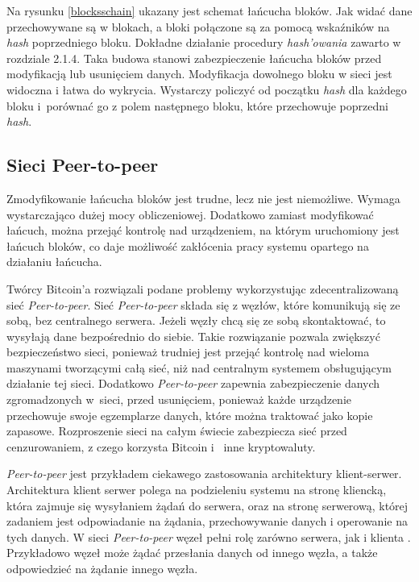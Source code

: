 \documentclass[a4paper,12pt]{book}
\begin{document}
Na rysunku \ref{blocksschain} ukazany jest schemat łańcucha bloków. Jak widać dane przechowywane są w blokach, a bloki połączone są za pomocą wskaźników na \textit{hash} poprzedniego bloku. Dokładne działanie procedury \textit{hash'owania} zawarto w rozdziale 2.1.4. Taka budowa stanowi zabezpieczenie łańcucha bloków przed modyfikacją lub usunięciem danych. Modyfikacja dowolnego bloku w sieci jest widoczna i łatwa do wykrycia. Wystarczy policzyć od początku \textit{hash} dla każdego bloku i~porównać go z polem następnego bloku, które przechowuje poprzedni \textit{hash}.

\subsection{Sieci Peer-to-peer}

Zmodyfikowanie łańcucha bloków jest trudne, lecz nie jest niemożliwe. Wymaga wystarczająco dużej mocy obliczeniowej. Dodatkowo zamiast modyfikować łańcuch, można przejąć kontrolę nad urządzeniem, na którym uruchomiony jest łańcuch bloków, co daje możliwość zakłócenia pracy systemu opartego na działaniu łańcucha.

Twórcy Bitcoin'a rozwiązali podane problemy wykorzystując zdecentralizowaną sieć \textit{Peer-to-peer}. Sieć \textit{Peer-to-peer} składa się z węzłów, które komunikują się ze sobą, bez centralnego serwera. Jeżeli węzły chcą się ze sobą skontaktować, to wysyłają dane bezpośrednio do siebie. Takie rozwiązanie pozwala zwiększyć bezpieczeństwo sieci, ponieważ trudniej jest przejąć kontrolę nad wieloma maszynami tworzącymi całą sieć, niż nad centralnym systemem obsługującym działanie tej sieci. Dodatkowo \textit{Peer-to-peer} zapewnia zabezpieczenie danych zgromadzonych w~sieci, przed usunięciem, ponieważ każde urządzenie przechowuje swoje egzemplarze danych, które można traktować jako kopie zapasowe. 
Rozproszenie sieci na całym świecie zabezpiecza sieć przed cenzurowaniem, z czego korzysta Bitcoin i~ inne kryptowaluty.

\textit{Peer-to-peer} jest przykładem ciekawego zastosowania architektury klient-serwer. Architektura klient serwer polega na podzieleniu systemu na stronę kliencką, która zajmuje się wysyłaniem żądań do serwera, oraz na stronę serwerową, której zadaniem jest odpowiadanie na żądania, przechowywanie danych i operowanie na tych danych. W sieci \textit{Peer-to-peer} węzeł pełni rolę zarówno serwera, jak i klienta \cite{p2pbib}. 
Przykładowo węzeł może żądać przesłania danych od innego węzła, a także odpowiedzieć na żądanie innego węzła.
\end{document}
